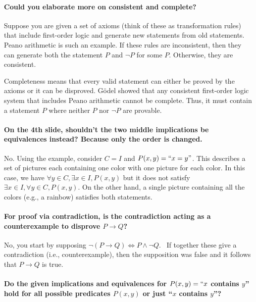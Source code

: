 \documentclass[10pt,english]{article}
\begin{document}
\paragraph{Could you elaborate more on consistent and complete?}

Suppose you are given a set of axioms (think of these as transformation rules) that include first-order logic and generate new statements from old statements. Peano arithmetic is such an example.  If these rules are inconsistent, then they can generate both the statement $P$ and $\neg P$ for some $P$.  Otherwise, they are consistent.

Completeness means that every valid statement can either be proved by the axioms or it can be disproved.  G\"{o}del showed that any consistent first-order logic system that includes Peano arithmetic cannot be complete.  Thus, it must contain a statement $P$ where neither $P$ nor $\neg P$ are provable.  

    
\paragraph{On the 4th slide, shouldn't the two middle implications be equivalences instead? Because only the order is changed.}

No. Using the example, consider $C=I$ and $P(x,y) = ``x=y"$.  This describes a set of pictures each containing one color with one picture for each color.  In this case, we have $\forall y\in C, \exists x\in I, P(x,y)$ but it does not satisfy $\exists x\in I, \forall y\in C, P(x,y)$.  On the other hand, a single picture containing all the colors (e.g., a rainbow) satisfies both statements.

    
\paragraph{For proof via contradiction, is the contradiction acting as a counterexample to disprove $P \to Q$?}

No, you start by supposing $\neg(P \to Q) \Leftrightarrow P \wedge \neg Q$.  If together these give a contradiction (i.e., counterexample), then the supposition was false and it follows that $P \to Q$ is true.

\paragraph{Do the given implications and equivalences for $P(x, y) = ``x$ contains $y$'' hold for all possible predicates $P(x, y)$ or just ``$x$ contains $y$''?}
\end{document}
